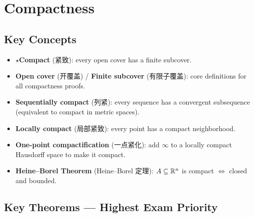 \documentclass{article}
\newcommand{\starKey}{\textcolor{red!65!black}{\textbf{$\star$}}}
\begin{document}
\section{Compactness}

\subsection{Key Concepts}

\begin{itemize}
  \item \starKey \textbf{Compact} (紧致): every open cover has a finite subcover.
  \item \textbf{Open cover} (开覆盖) / \textbf{Finite subcover} (有限子覆盖):
  core definitions for all compactness proofs.
  \item \textbf{Sequentially compact} (列紧): every sequence has a convergent subsequence
  (equivalent to compact in metric spaces).
  \item \textbf{Locally compact} (局部紧致): every point has a compact neighborhood.
  \item \textbf{One-point compactification} (一点紧化): add $\infty$ to a locally compact
  Hausdorff space to make it compact.
  \item \textbf{Heine--Borel Theorem} (Heine--Borel 定理):
  $A\subseteq\mathbb{R}^n$ is compact $\iff$ closed and bounded.
\end{itemize}

\subsection{Key Theorems --- Highest Exam Priority}
\end{document}

